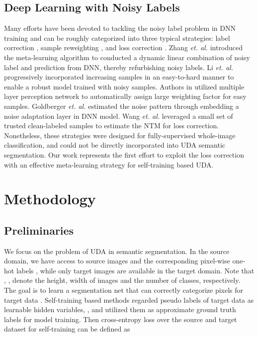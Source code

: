 \documentclass[final]{cvpr}
\begin{document}
\subsection{Deep Learning with Noisy Labels}
\vspace{-0.1cm}
Many efforts have been devoted to tackling the noisy label problem in DNN training and can be roughly categorized into three typical strategies: label correction \cite{arazo2019unsupervised, zhang2020distilling}, sample reweighting \cite{jiang2018mentornet, li2017self, shu2019meta}, and loss correction \cite{goldberger2016training, hendrycks2018using, patrini2017making, shu2020meta, wang2020training}. Zhang \textit{et. al.} \cite{zhang2020distilling} introduced the meta-learning algorithm to conducted a dynamic linear combination of noisy label and prediction from DNN, thereby refurbishing noisy labels. Li \textit{et. al.} \cite{shu2020meta} progressively incorporated increasing samples in an easy-to-hard manner to enable a robust model trained with noisy samples. Authors in \cite{jiang2018mentornet, shu2020meta} utilized multiple layer perception network to automatically assign large weighting factor for easy samples. Goldberger \textit{et. al.} \cite{goldberger2016training} estimated the noise pattern through embedding a noise adaptation layer in DNN model. Wang \textit{et. al.} \cite{wang2020training} leveraged a small set of trusted clean-labeled samples to estimate the NTM for loss correction. Nonetheless, these strategies were designed for fully-supervised whole-image classification, and could not be directly incorporated into UDA  semantic segmentation. Our work represents the first effort to exploit the loss correction with an effective meta-learning strategy for self-training based UDA. 

\section{Methodology}
\vspace{-0.1cm}
\subsection{Preliminaries}
\vspace{-0.1cm}
We focus on the problem of UDA in semantic segmentation. In the source domain, we have access to source images  and the corresponding pixel-wise one-hot labels , while only target images  are available in the target domain. Note that , ,  denote the height, width of images and the number of classes, respectively. The goal is to learn a segmentation net  that can correctly categorize pixels for target data . Self-training based methods  \cite{iqbal2020mlsl, lian2019constructing, pan2020unsupervised, sakaridis2019guided, zhang2019category, zhu2020improving, zou2019confidence} regarded pseudo labels of target data as learnable hidden variables, , and utilized them as approximate ground truth labels for model training. Then cross-entropy loss over the source and target dataset for self-training can be defined as
\end{document}
